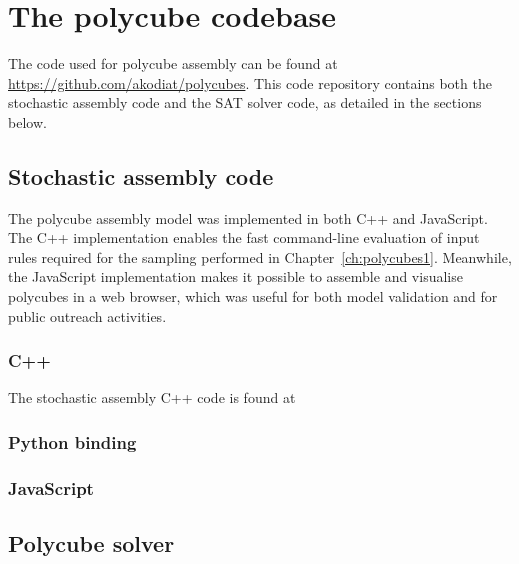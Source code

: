 

\chapter{The polycube codebase}
\label{ch:appendix_polycubes}

\minitoc

The code used for polycube assembly can be found at \url{https://github.com/akodiat/polycubes}. This code repository contains both the stochastic assembly code and the SAT solver code, as detailed in the sections below.

\section{Stochastic assembly code}
The polycube assembly model was implemented in both C++ and JavaScript. The C++ implementation enables the fast command-line evaluation of input rules required for the sampling performed in Chapter~\ref{ch:polycubes1}. Meanwhile, the JavaScript implementation makes it possible to assemble and visualise polycubes in a web browser, which was useful for both model validation and for public outreach activities.

\subsection{C++}
The stochastic assembly C++ code is found at 

\subsection{Python binding}

\subsection{JavaScript}

\section{Polycube solver}

